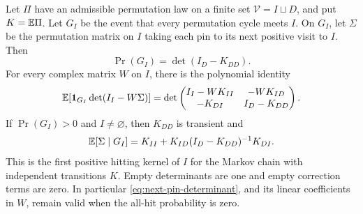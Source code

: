\begin{lemma}\label{lem:next-pin}
Let $\Pi$ have an admissible permutation law on a finite set
$\mathcal V=I\sqcup D$, and put $K=\mathbb E\Pi$.  Let $G_I$ be the
event that every permutation cycle meets $I$.  On $G_I$, let
$\Sigma$ be the permutation matrix on $I$ taking each pin to its
next positive visit to $I$.  Then
\begin{equation}\label{eq:all-hit}
                    \Pr(G_I)=\det(I_D-K_{DD}).
\end{equation}
For every complex matrix $W$ on $I$, there is the polynomial identity
\begin{equation}\label{eq:next-pin-determinant}
 \mathbb E[\mathbf1_{G_I}\det(I_I-W\Sigma)]
  =\det\begin{pmatrix}
       I_I-WK_{II}&-WK_{ID}\\
       -K_{DI}&I_D-K_{DD}
       \end{pmatrix}.
\end{equation}
If $\Pr(G_I)>0$ and $I\ne\varnothing$, then $K_{DD}$ is transient
and
\begin{equation}\label{eq:next-pin-mean}
 \mathbb E[\Sigma\mid G_I]
    =K_{II}+K_{ID}(I_D-K_{DD})^{-1}K_{DI}.
\end{equation}
This is the first positive hitting kernel of $I$ for the Markov chain
with independent transitions $K$.  Empty determinants are one and
empty correction terms are zero.  In particular
\eqref{eq:next-pin-determinant}, and its linear coefficients in $W$,
remain valid when the all-hit probability is zero.
\end{lemma}

